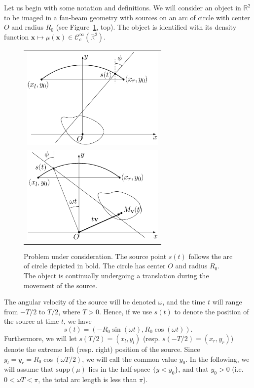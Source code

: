 \documentclass[letterpaper,twocolumn]{IEEEtran}
\newcommand{\R}{\mathbb{R}}
\newcommand{\ie}{i.e.}
\newcommand{\Ccinf}{\mathcal{C}_c^{\infty}}
\newcommand{\supp}{\textrm{supp}}
\begin{document}
Let us begin with some notation and definitions. We will consider an object in $\R^2$ to be imaged in a fan-beam geometry with sources on an arc of circle with center $O$ and radius $R_0$ (see Figure~\ref{fig:notations}, top). The object is identified with its density function $\mathbf{x} \mapsto \mu(\mathbf{x}) \in \Ccinf(\R^2)$.
\begin{figure}[!ht]
	\centering
	\begin{tabular}{c}
	\includegraphics[width=70mm]{figs/frame_scanner_still.eps} \\
	\includegraphics[width=70mm]{figs/frame_scanner.eps}
	\end{tabular}
	\caption{Problem under consideration. The source point $s(t)$ follows the arc of circle depicted in bold. The circle has center $O$ and radius $R_0$. The object is continually undergoing a translation during the movement of the source.\label{fig:notations}}
\end{figure}
The angular velocity of the source will be denoted $\omega$, and the time $t$ will range from $-T/2$ to $T/2$, where $T>0$. Hence, if we use $s(t)$ to denote the position of the source at time $t$, we have
\begin{equation}
	s(t) = \left( -R_0 \sin(\omega t), R_0 \cos(\omega t) \right).
\label{eq:source_position}
\end{equation}
Furthermore, we will let $s(T/2)=(x_l,y_l)$ (resp. $s(-T/2)=(x_r,y_r)$) denote the extreme left (resp. right) position of the source. Since $y_l = y_r = R_0 \cos(\omega T/2)$, we will call the common value $y_0$. In the following, we will assume that $\supp(\mu)$ lies in the half-space $\{ y < y_0 \}$, and that $y_0 > 0$ (\ie $0 < \omega T < \pi$, the total arc length is less than $\pi$).
\end{document}
